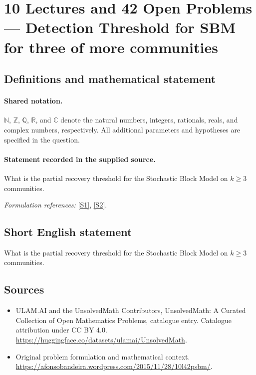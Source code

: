 \documentclass[11pt]{article}
\newcommand{\sref}[2]{\hyperlink{source:#1:#2}{[S#2]}}
\begin{document}
\section{10 Lectures and 42 Open Problems — Detection Threshold for SBM for three of more communities}\label{statement}

\subsection{Definitions and mathematical statement}

\paragraph{Shared notation.}$\mathbb N$, $\mathbb Z$, $\mathbb Q$, $\mathbb R$, and $\mathbb C$ denote the natural numbers, integers, rationals, reals, and complex numbers, respectively. All additional parameters and hypotheses are specified in the question.


\paragraph{Statement recorded in the supplied source.}
What is the partial recovery threshold for the Stochastic Block Model on $k\geq 3$ communities.
\par\smallskip\textit{Formulation references:} \sref{statement}{1}, \sref{statement}{2}.
\subsection{Short English statement}
What is the partial recovery threshold for the Stochastic Block Model on $k\geq 3$ communities.
\subsection{Sources}
\begin{itemize}
\item[\hypertarget{source:statement:1}{S1}] ULAM.AI and the UnsolvedMath Contributors, UnsolvedMath: A Curated Collection of Open Mathematics Problems, catalogue entry. Catalogue attribution under CC BY 4.0.
\url{https://huggingface.co/datasets/ulamai/UnsolvedMath}.
\item[\hypertarget{source:statement:2}{S2}] Original problem formulation and mathematical context.
\url{https://afonsobandeira.wordpress.com/2015/11/28/10l42psbm/}.
\end{itemize}
\label{end:statement}
\end{document}
